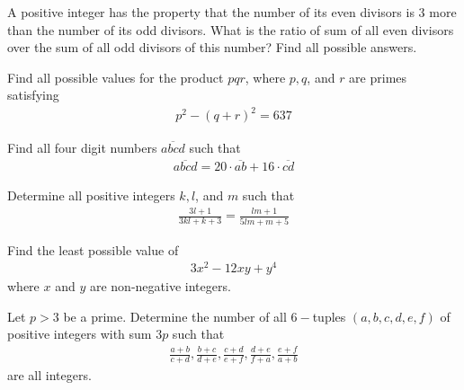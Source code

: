 \begin{problem}
	A positive integer has the property that the number of its even divisors is $3$ more than the number of its odd divisors. What is the ratio of sum of all even divisors over the sum of all odd divisors of this number? Find all possible answers.
\end{problem}

\begin{problem}
	Find all possible values for the product $pqr$, where $p, q$, and $r$ are primes satisfying
	\begin{align*}
		p^2 - (q+r)^2 = 637
	\end{align*}
\end{problem}

\begin{problem}
	Find all four digit numbers $\overline{abcd}$ such that
	\begin{align*}
		\overline{abcd} = 20 \cdot \overline{ab} + 16 \cdot \overline{cd}
	\end{align*}
\end{problem}

\begin{problem}
	Determine all positive integers $k,l$, and $m$ such that
		\begin{align*}
			\frac{3l+1}{3kl+k+3} = \frac{lm + 1}{5lm+m+5}
		\end{align*}
\end{problem}

\begin{problem}
	Find the least possible value of
		\begin{align*}
			3x^2 - 12xy + y^4
		\end{align*}
	where $x$ and $y$ are non-negative integers.
\end{problem}

\begin{problem}
	Let $p>3$ be a prime. Determine the number of all $6-$tuples $(a,b,c,d,e,f)$ of positive integers with sum $3p$ such that
		\begin{align*}
			\frac{a+b}{c+d}, \frac{b+c}{d+e}, \frac{c+d}{e+f}, \frac{d+e}{f+a}, \frac{e+f}{a+b}
		\end{align*}
	are all integers.
\end{problem}

